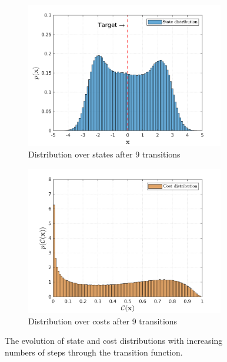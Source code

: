 \begin{figure}[htbp]
    \vspace{4ex}
  \begin{subfigure}[b]{0.48\linewidth}
    \centering
    \includegraphics[height=0.22\textheight,width=0.95\textwidth]{Chapter3/Figures/trans_traj_hist_4.png} 
    \caption{Distribution over states after 9 transitions} 
    \label{Fig:Re-hist-traj-4} 
  \end{subfigure}
  \hspace{\fill}
  \begin{subfigure}[b]{0.48\linewidth}
    \centering
    \includegraphics[height=0.22\textheight,width=0.95\textwidth]{Chapter3/Figures/trans_cost_hist_4.png} 
    \caption{Distribution over costs after 9 transitions} 
    \label{Fig:Re-hist-cost-4} 
  \end{subfigure} 
\caption[Evolution of state and cost distributions]{The evolution of state and cost distributions with increasing numbers of steps through the transition function.}
\label{Fig:Re-evolution-of-state-and-cost} 
\end{figure}

